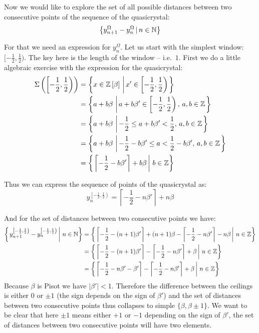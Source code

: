 \documentclass[text.tex]{subfiles}
\begin{document}
Now we would like to explore the set of all possible distances between two consecutive points of the sequence of the quasicrystal: 
$$\left\{ y^\Omega_{n+1}-y^\Omega_{n}\,|\, n\in\mathbb{N} \right\}$$

For that we need an expression for $y^\Omega_n$. Let us start with the simplest window: $[-\frac{1}{2}, \frac{1}{2})$. The key here is the length of the window -- i.e.\ $1$. First we do a little algebraic exercise with the expression for the quasicrystal:
\begin{align*}
\Sigma\left(\left[-\frac{1}{2}, \frac{1}{2}\right)\right) &= \left\{x\in\ring\,\left|\, x'\in \left[-\frac{1}{2}, \frac{1}{2}\right)\right.\right\}\\%
 &= \left\{a+b\beta\,\left|\, a+b\beta'\in \left[-\frac{1}{2}, \frac{1}{2}\right),\,a,b\in\ZZ\right.\right\}\\%
  &= \left\{a+b\beta\,\left|\, -\frac{1}{2}\leq a+b\beta'<\frac{1}{2},\,a,b\in\ZZ\right.\right\}\\
  &= \left\{a+b\beta\,\left|\, -\frac{1}{2}-b\beta'\leq a < \frac{1}{2}-b\beta',\,a,b\in\ZZ\right.\right\}\\
  &= \left\{\left.\left\lceil-\frac{1}{2} -b\beta'\right\rceil + b\beta\,\right|\, b\in\ZZ\right\}\\
\end{align*}


Thus we can express the sequence of points of the quasicrystal as:
$$y^{\left[-\frac{1}{2}, \frac{1}{2}\right)}_n = \left\lceil-\frac{1}{2} -n\beta'\right\rceil + n\beta$$%

And for the set of distances between two consecutive points we have:
\begin{align*}
\left\{\left. y^{\left[-\frac{1}{2}, \frac{1}{2}\right)}_{n+1}-y^{\left[-\frac{1}{2}, \frac{1}{2}\right)}_{n}\,\right|\, n\in\mathbb{N} \right\} &= \left\{ \left.\left\lceil-\frac{1}{2} -(n+1)\beta'\right\rceil + (n+1)\beta - \left\lceil-\frac{1}{2} -n\beta'\right\rceil - n\beta \,\right|\, n\in\mathbb{Z}\right\}\\
&= \left\{ \left.\left\lceil-\frac{1}{2} -(n+1)\beta'\right\rceil - \left\lceil-\frac{1}{2} -n\beta'\right\rceil + \beta \,\right|\, n\in\mathbb{Z}\right\}\\
&= \left\{ \left.\left\lceil-\frac{1}{2} -n\beta' - \beta'\right\rceil - \left\lceil-\frac{1}{2} -n\beta'\right\rceil + \beta \,\right|\, n\in\mathbb{Z}\right\}
\end{align*}%
Because $\beta$ is Pisot we have $|\beta'|<1$. Therefore the difference between the ceilings is either $0$ or $\pm1$ (the sign depends on the sign of $\beta'$) and the set of distances between two consecutive points thus collapses to simple $\{\beta, \beta \pm 1\}$. We want to be clear that here $\pm 1$ means either $+1$ or $-1$ depending on the sign of $\beta'$, the set of distances between two consecutive points will have two elements. 
\end{document}
